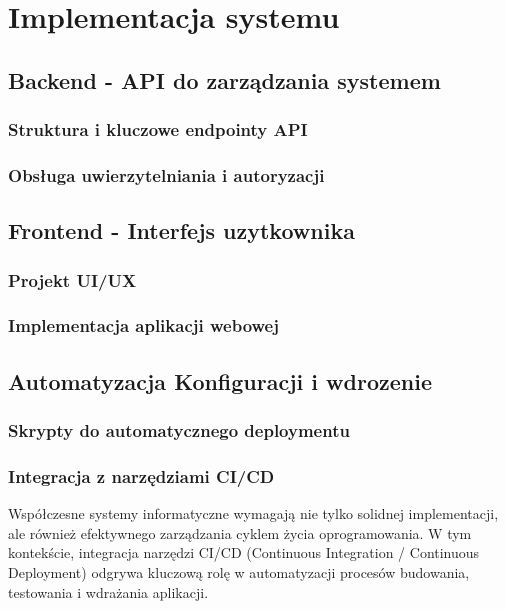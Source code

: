 \chapter{Implementacja systemu}

\section{Backend - API do zarządzania systemem}

\subsection{Struktura i kluczowe endpointy API}

\subsection{Obsługa uwierzytelniania i autoryzacji}

\section{Frontend - Interfejs uzytkownika}

\subsection{Projekt UI/UX}

\subsection{Implementacja aplikacji webowej}

\section{Automatyzacja Konfiguracji i wdrozenie}

\subsection{Skrypty do automatycznego deploymentu}

\subsection{Integracja z narzędziami CI/CD}
\label{sec:integracja_ci_cd}

Współczesne systemy informatyczne wymagają nie tylko solidnej implementacji, ale również efektywnego zarządzania cyklem życia oprogramowania. W tym kontekście, integracja narzędzi CI/CD (Continuous Integration / Continuous Deployment) odgrywa kluczową rolę w automatyzacji procesów budowania, testowania i wdrażania aplikacji.

